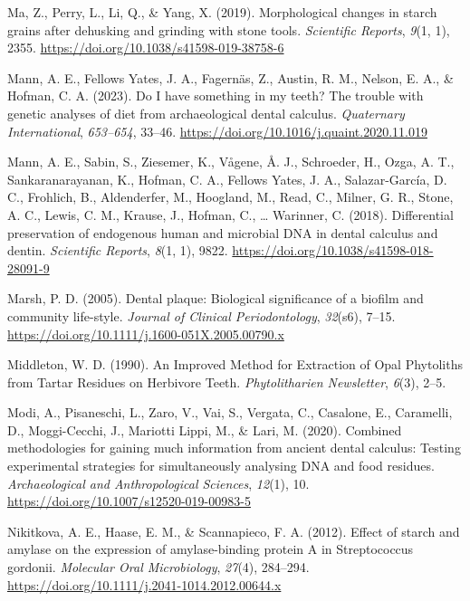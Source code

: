 \documentclass[
  letterpaper,
]{book}
\newlength{\cslhangindent}
\newlength{\cslentryspacingunit} %
\newenvironment{CSLReferences}[2] %
 {%
  \setlength{\parindent}{0pt}
  \ifodd #1
  \let\oldpar\par
  \def\par{\hangindent=\cslhangindent\oldpar}
  \fi
  \setlength{\parskip}{#2\cslentryspacingunit}
 }%
 {}
\begin{document}
\begin{CSLReferences}{1}{0}
\leavevmode{}%
Ma, Z., Perry, L., Li, Q., \& Yang, X. (2019). Morphological changes in
starch grains after dehusking and grinding with stone tools.
\emph{Scientific Reports}, \emph{9}(1, 1), 2355.
\url{https://doi.org/10.1038/s41598-019-38758-6}

\leavevmode{}%
Mann, A. E., Fellows Yates, J. A., Fagernäs, Z., Austin, R. M., Nelson,
E. A., \& Hofman, C. A. (2023). Do {I} have something in my teeth? {The}
trouble with genetic analyses of diet from archaeological dental
calculus. \emph{Quaternary International}, \emph{653--654}, 33--46.
\url{https://doi.org/10.1016/j.quaint.2020.11.019}

\leavevmode{}%
Mann, A. E., Sabin, S., Ziesemer, K., Vågene, Å. J., Schroeder, H.,
Ozga, A. T., Sankaranarayanan, K., Hofman, C. A., Fellows Yates, J. A.,
Salazar-García, D. C., Frohlich, B., Aldenderfer, M., Hoogland, M.,
Read, C., Milner, G. R., Stone, A. C., Lewis, C. M., Krause, J., Hofman,
C., \ldots{} Warinner, C. (2018). Differential preservation of
endogenous human and microbial {DNA} in dental calculus and dentin.
\emph{Scientific Reports}, \emph{8}(1, 1), 9822.
\url{https://doi.org/10.1038/s41598-018-28091-9}

\leavevmode{}%
Marsh, P. D. (2005). Dental plaque: Biological significance of a biofilm
and community life-style. \emph{Journal of Clinical Periodontology},
\emph{32}(s6), 7--15.
\url{https://doi.org/10.1111/j.1600-051X.2005.00790.x}

\leavevmode{}%
Middleton, W. D. (1990). An {Improved Method} for {Extraction} of {Opal
Phytoliths} from {Tartar Residues} on {Herbivore Teeth}.
\emph{Phytolitharien Newsletter}, \emph{6}(3), 2--5.

\leavevmode{}%
Modi, A., Pisaneschi, L., Zaro, V., Vai, S., Vergata, C., Casalone, E.,
Caramelli, D., Moggi-Cecchi, J., Mariotti Lippi, M., \& Lari, M. (2020).
Combined methodologies for gaining much information from ancient dental
calculus: Testing experimental strategies for simultaneously analysing
{DNA} and food residues. \emph{Archaeological and Anthropological
Sciences}, \emph{12}(1), 10.
\url{https://doi.org/10.1007/s12520-019-00983-5}

\leavevmode{}%
Nikitkova, A. E., Haase, E. M., \& Scannapieco, F. A. (2012). Effect of
starch and amylase on the expression of amylase-binding protein {A} in
{Streptococcus} gordonii. \emph{Molecular Oral Microbiology},
\emph{27}(4), 284--294.
\url{https://doi.org/10.1111/j.2041-1014.2012.00644.x}


\end{CSLReferences}
\end{document}
